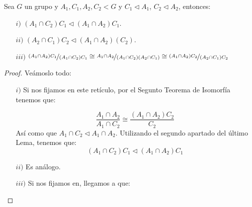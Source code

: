 \begin{teo}\label{teo:4_isomorfia}
    Sea $G$ un grupo y $A_1,C_1,A_2,C_2 < G$ y $C_1\lhd A_1$, $C_2 \lhd A_2$, entonces:
    \begin{enumerate}
        \item[$i)$] $(A_1\cap C_2) C_1 \lhd (A_1 \cap A_2)C_1$.
        \item[$ii)$] $(A_2 \cap C_1) C_2 \lhd (A_1\cap A_2)(C_2)$.
        \item[$iii)$] $\nicefrac{(A_1\cap A_2)C_1}{(A_1\cap C_2)C_1} \cong \nicefrac{A_1\cap A_2}{(A_1\cap C_2)(A_2\cap C_1)}\cong \nicefrac{(A_1\cap A_2)C_2}{(A_2\cap C_1)C_2} $
    \end{enumerate}

    \begin{proof} Veámoslo todo:
        \begin{enumerate}
            \item[$i)$] Si nos fijamos en este retículo, por el Segunto Teorema de Isomorfía tenemos que:
                \begin{figure}[H]
                    \centering
                \end{figure}
                \begin{equation*}
                    \dfrac{A_1\cap A_2}{A_1 \cap C_2} \cong \dfrac{(A_1\cap A_2)C_2}{C_2}
                \end{equation*}
                Así como que $A_1\cap C_2\lhd A_1\cap A_2$. Utilizando el segundo apartado del último Lema, tenemos que:
                \begin{equation*}
                    (A_1\cap C_2)C_1 \lhd (A_1\cap A_2)C_1
                \end{equation*}
            \item[$ii)$] Es análogo.
            \item[$iii)$] Si nos fijamos en, llegamos a que:


\end{enumerate}
\end{proof}
\end{teo}
